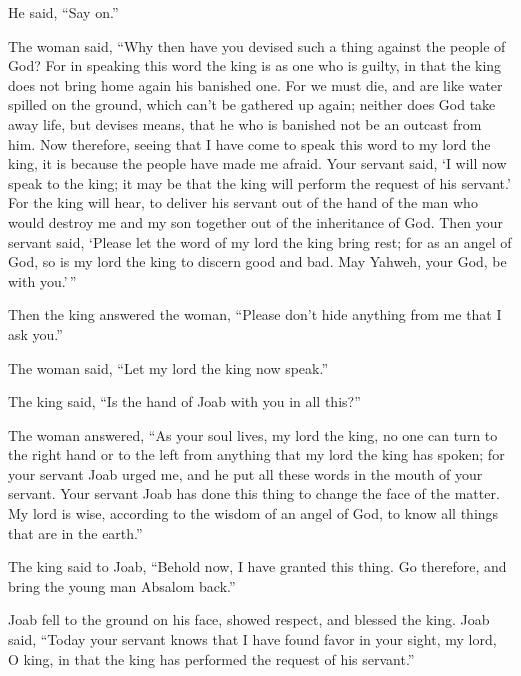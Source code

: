 He said, ``Say on.''

 The woman said, ``Why then have you devised such a thing
against the people of God? For in speaking this word the king is as one
who is guilty, in that the king does not bring home again his banished
one.  For we must die, and are like water spilled on the
ground, which can't be gathered up again; neither does God take away
life, but devises means, that he who is banished not be an outcast from
him.  Now therefore, seeing that I have come to speak
this word to my lord the king, it is because the people have made me
afraid. Your servant said, `I will now speak to the king; it may be that
the king will perform the request of his servant.'  For
the king will hear, to deliver his servant out of the hand of the man
who would destroy me and my son together out of the inheritance of God.
 Then your servant said, `Please let the word of my lord
the king bring rest; for as an angel of God, so is my lord the king to
discern good and bad. May Yahweh, your God, be with you.'\,''

 Then the king answered the woman, ``Please don't hide
anything from me that I ask you.''

The woman said, ``Let my lord the king now speak.''

 The king said, ``Is the hand of Joab with you in all
this?''

The woman answered, ``As your soul lives, my lord the king, no one can
turn to the right hand or to the left from anything that my lord the
king has spoken; for your servant Joab urged me, and he put all these
words in the mouth of your servant.  Your servant Joab
has done this thing to change the face of the matter. My lord is wise,
according to the wisdom of an angel of God, to know all things that are
in the earth.''

 The king said to Joab, ``Behold now, I have granted this
thing. Go therefore, and bring the young man Absalom back.''

 Joab fell to the ground on his face, showed respect, and
blessed the king. Joab said, ``Today your servant knows that I have
found favor in your sight, my lord, O king, in that the king has
performed the request of his servant.''


